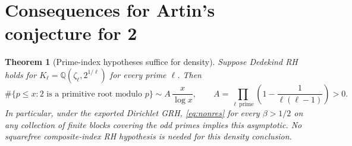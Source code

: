 \documentclass[11pt,letterpaper]{article}
\newtheorem{theorem}{Theorem}[section]\newtheorem{lemma}[theorem]{Lemma}\newtheorem{proposition}[theorem]{Proposition}\newtheorem{corollary}[theorem]{Corollary}
\theoremstyle{definition}\newtheorem{definition}[theorem]{Definition}
\theoremstyle{remark}\newtheorem{remark}[theorem]{Remark}
\newcommand{\Q}{\mathbb Q}\newcommand{\C}{\mathbb C}\newcommand{\R}{\mathbb R}\newcommand{\F}{\mathbb F}\newcommand{\ord}{\operatorname{ord}}\newcommand{\Li}{\operatorname{Li}}\newcommand{\Gal}{\operatorname{Gal}}\newcommand{\Res}{\operatorname{Res}}\newcommand{\ind}{\operatorname{Ind}}\newcommand{\one}{\mathbf 1}
\begin{document}
\section{Consequences for Artin's conjecture for 2}\label{sec:artin}
\begin{theorem}[Prime-index hypotheses suffice for density]\label{thm:artin}
Suppose Dedekind RH holds for $K_\ell=\Q(\zeta_\ell,2^{1/\ell})$ for every prime $\ell$. Then
\[
\#\{p\le x:2\text{ is a primitive root modulo }p\}\sim A\,\frac{x}{\log x},\qquad A=\prod_{\ell\ \mathrm{prime}}\left(1-\frac1{\ell(\ell-1)}\right)>0.
\]
In particular, under the exported Dirichlet GRH, \eqref{eq:nonres} for every $\beta>1/2$ on any collection of finite blocks covering the odd primes implies this asymptotic. No squarefree composite-index RH hypothesis is needed for this density conclusion.
\end{theorem}
\end{document}
